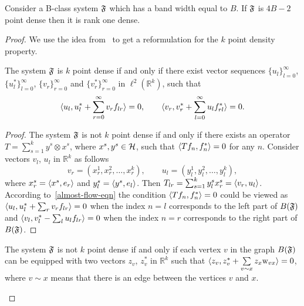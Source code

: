 \documentclass[12pt,oneside,a4paper]{amsart}
\begin{document}
      \begin{theorem}
        \label{thm-kpd}
        Consider a B-class system $\fsys$ which has a band width equal to $B$.
        If $\fsys$ is $4B - 2$ point dense then it is rank one dense.
      \end{theorem}
      \begin{proof}
        We use the idea from~\cite{me} to get a reformulation for the $k$ point density property.
        \begin{prop}
          \label{prop-vec-est}
          The system $\fsys$ is $k$ point dense if and only if there exist vector sequences $\{u_l\}_{l=0}^\infty$, $\{u^*_l\}_{l=0}^\infty$,
            $\{v_r\}_{r=0}^\infty$ and $\{v^*_r\}_{r=0}^\infty$ in $\ell^2 (\mathbb{R}^k)$, such that
          \begin{equation}
            \label{prop-vec-eqn}
            \inner{u_l}{u^*_l + \sum_{r=0}^\infty v_r f_{lr}} = 0, \quad \quad
            \inner{v_r}{v^*_r + \sum_{l=0}^\infty u_l f_{rl}^*} = 0.
          \end{equation}
        \end{prop}
        \begin{proof}
          The system $\fsys$ is not $k$ point dense if and only if there exists an operator $T = \sum_{s=1}^k y^s \otimes x^s$, where
            $x^s, y^s \in \cal{H}$, such that $\inner{Tf_n}{f_n^*} = 0$ for any $n$.
          Consider vectors $v_l$, $u_l$ in $\mathbb{R}^k$ as follows
          \begin{equation*}
            v_r = (x^1_r, x^2_r, \dots, x^k_r),\qquad
            u_l = (y^1_l, y^2_l, \dots, y^k_l),
          \end{equation*}
            where $x^s_r = \inner{x^s}{e_r}$ and $y^s_l = \inner{y^s}{e_l}$.
          Then $T_{lr} = \sum_{s=1}^k y^s_l x^s_r = \inner{v_r}{u_l}$.
          According to~\eqref{almost-flow-eqn} the condition $\inner{Tf_n}{f^*_n} = 0$ could be viewed as
            $\inner{u_l}{u^*_l + \sum_r v_r f_{lr}} = 0$
          when the index $n=l$ corresponds to the left part of $B(\fsys)$ and
            $\inner{v_l}{v^*_l - \sum_l u_l f_{lr}} = 0$
          when the index $n=r$ corresponds to the right part of $B(\fsys)$.
        \end{proof}
        \begin{corol*}
          The system $\fsys$ is not $k$ point dense if and only if each vertex $v$ in the graph $B(\fsys)$ can be
            equipped with two vectors $z_v$, $z_v^*$ in $\mathbb{R}^k$ such that $\inner{z_v}{z_v^* + \sum\limits_{v \sim x} z_x \wt_{vx}} = 0$,
            where $v \sim x$ means that there is an edge between the vertices $v$ and $x$.
        \end{corol*}


\end{proof}
\end{document}
